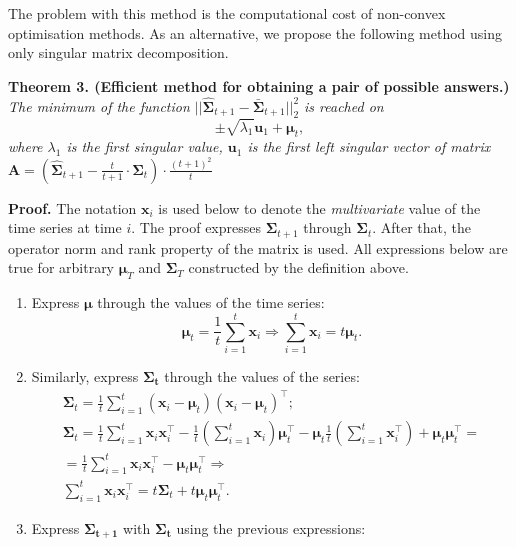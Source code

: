 \documentclass[12pt]{article}
\begin{document}
The problem with this method is the computational cost of non-convex optimisation methods. As an alternative, we propose the following method using only singular matrix decomposition.

{\textbf{Theorem 3. (Efficient method for obtaining a pair of possible answers.)} \emph{ The minimum of the function $||\hat{\mathbf{\Sigma}}_{t+1} - \bar{\mathbf{\Sigma}}_{t+1}||_2^2$ is reached on \[\pm\sqrt{\lambda_1} \mathbf{u}_1 + \boldsymbol{\mu}_t,\] where $\lambda_1$ is the first singular value, $\mathbf{u}_1$ is the first left singular vector of matrix $\mathbf{A}=\left(\hat{\mathbf{\Sigma}}_{t+1} - \frac{t}{t+1} \cdot \mathbf{\Sigma}_t \right) \cdot \frac{(t+1)^2}{t}$}

\textbf{Proof.} The notation $\mathbf{x}_i$ is used below to denote the \emph{multivariate} value of the time series at time $i$. The proof expresses $\mathbf{\Sigma}_{t+1}$ through $\mathbf{\Sigma}_t$. After that, the operator norm and rank property of the matrix is used. All expressions below are true for arbitrary $\boldsymbol{\mu}_T$ and $\mathbf{\Sigma}_T$ constructed by the definition above.
\begin{enumerate}
	\item Express $\boldsymbol{\mu}$ through the values of the time series: \[\boldsymbol{\mu}_t = \frac{1}{t} \sum_{i=1}^{t} \mathbf{x}_i \Rightarrow \sum_{i=1}^{t} \mathbf{x}_i = t \boldsymbol{\mu}_t.\]
	\item Similarly, express $\mathbf{\Sigma_t}$ through the values of the series:
		\begin{gather*}
		\mathbf{\Sigma}_t = \frac{1}{t} \sum_{i=1}^{t} (\mathbf{x}_i-\boldsymbol{\mu}_t)(\mathbf{x}_i-\boldsymbol{\mu}_t)^\intercal;\\
		\mathbf{\Sigma}_t = \frac{1}{t} \sum_{i=1}^{t} \mathbf{x}_i \mathbf{x}_i^\intercal - \frac{1}{t} \left( \sum_{i=1}^{t} \mathbf{x}_i\right) \boldsymbol{\mu}_t^\intercal - \boldsymbol{\mu}_t \frac{1}{t} \left( \sum_{i=1}^{t} \mathbf{x}_i^\intercal\right) + \boldsymbol{\mu}_t \boldsymbol{\mu}_t^\intercal =\\= \frac{1}{t} \sum_{i=1}^{t} \mathbf{x}_i \mathbf{x}_i^\intercal - \boldsymbol{\mu}_t \boldsymbol{\mu}_t^\intercal \Rightarrow\\
		\sum_{i=1}^{t} \mathbf{x}_i \mathbf{x}_i^\intercal = t \mathbf{\Sigma}_t + t \boldsymbol{\mu}_t \boldsymbol{\mu}_t^\intercal.
		\end{gather*}
	\item Express $\mathbf{\Sigma_{t+1}}$ with $\mathbf{\Sigma_t}$ using the previous expressions:

\end{enumerate}}
\end{document}
